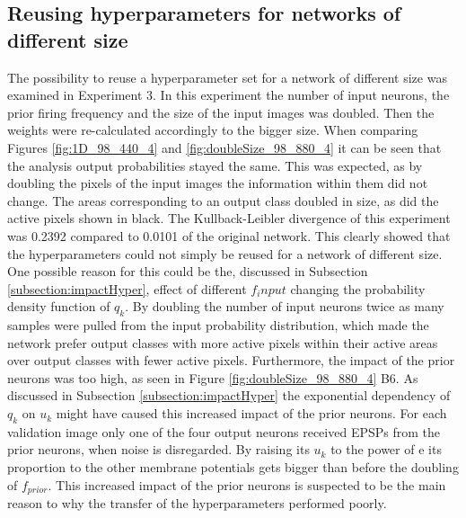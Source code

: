 \subsection{Reusing hyperparameters for networks of different size}
The possibility to reuse a hyperparameter set for a network of different size was examined in Experiment 3. In this experiment the number of input neurons, the prior firing frequency and the size of the input images was doubled. Then the weights were re-calculated accordingly to the bigger size. When comparing Figures \ref{fig:1D_98_440_4} and \ref{fig:doubleSize_98_880_4} it can be seen that the analysis output probabilities stayed the same. This was expected, as by doubling the pixels of the input images the information within them did not change. The areas corresponding to an output class doubled in size, as did the active pixels shown in black. The Kullback-Leibler divergence of this experiment was 0.2392 compared to 0.0101 of the original network. This clearly showed that the hyperparameters could not simply be reused for a network of different size. One possible reason for this could be the, discussed in Subsection \ref{subsection:impactHyper}, effect of different $f_input$ changing the probability density function of $q_k$. By doubling the number of input neurons twice as many samples were pulled from the input probability distribution, which made the network prefer output classes with more active pixels within their active areas over output classes with fewer active pixels. Furthermore, the impact of the prior neurons was too high, as seen in Figure \ref{fig:doubleSize_98_880_4} B6. As discussed in Subsection \ref{subsection:impactHyper} the exponential dependency of $q_k$ on $u_k$ might have caused this increased impact of the prior neurons. For each validation image only one of the four output neurons received EPSPs from the prior neurons, when noise is disregarded. By raising its $u_k$ to the power of e its proportion to the other membrane potentials gets bigger than before the doubling of $f_{prior}$. This increased impact of the prior neurons is suspected to be the main reason to why the transfer of the hyperparameters performed poorly.

